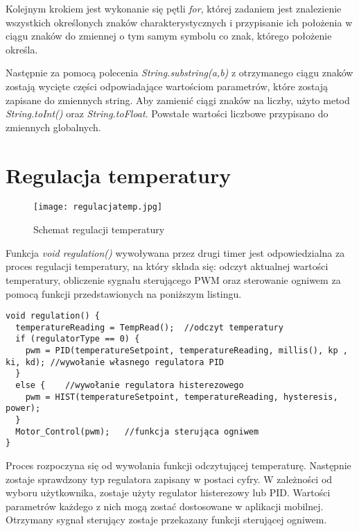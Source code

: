 Kolejnym krokiem jest wykonanie się pętli \textit{for}, której zadaniem jest znalezienie wszystkich określonych znaków charakterystycznych i przypisanie ich położenia w ciągu znaków do zmiennej o tym samym symbolu co znak, którego położenie określa.

Następnie za pomocą polecenia \textit{String.substring(a,b)} z otrzymanego ciągu znaków zostają wycięte części odpowiadające wartościom parametrów, które zostają zapisane do zmiennych string. Aby zamienić ciągi znaków na liczby, użyto metod \textit{String.toInt()} oraz \textit{String.toFloat}. Powstałe wartości liczbowe przypisano do zmiennych globalnych.
\newpage
\section{Regulacja temperatury}%
\begin{figure}[H]
	\centering
	\texttt{[image: regulacjatemp.jpg]}
	\caption{Schemat regulacji temperatury}
\end{figure}
Funkcja \textit{void regulation()} wywoływana przez drugi timer jest odpowiedzialna za proces regulacji temperatury, na który składa się: odczyt aktualnej wartości temperatury, obliczenie sygnału sterującego PWM oraz sterowanie ogniwem za pomocą funkcji przedstawionych na poniższym listingu.
\lstset{language=C++}
\begin{lstlisting}
void regulation() {
  temperatureReading = TempRead();	//odczyt temperatury
  if (regulatorType == 0) {	
    pwm = PID(temperatureSetpoint, temperatureReading, millis(), kp , ki, kd); //wywołanie własnego regulatora PID
  }
  else {	//wywołanie regulatora histerezowego
    pwm = HIST(temperatureSetpoint, temperatureReading, hysteresis, power);
  }
  Motor_Control(pwm);	//funkcja sterująca ogniwem
}
\end{lstlisting}
Proces rozpoczyna się od wywołania funkcji odczytującej temperaturę. Następnie zostaje sprawdzony typ regulatora zapisany w postaci cyfry. W zależności od wyboru użytkownika, zostaje użyty regulator histerezowy lub PID. Wartości parametrów każdego z nich mogą zostać dostosowane w aplikacji mobilnej. Otrzymany sygnał sterujący zostaje przekazany funkcji sterującej ogniwem.
